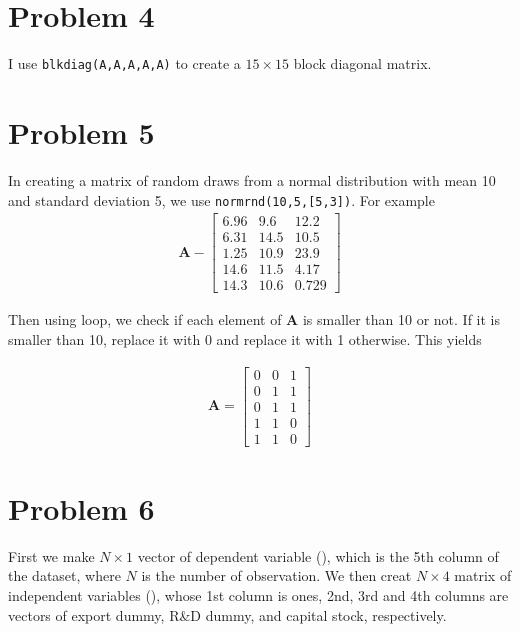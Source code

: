 \documentclass[11pt,letter]{article}
\newcommand{\vect}[1]{\boldsymbol{\mathbf{#1}}}
\newcounter{lem}[section] \setcounter{lem}{0}
\newcommand{\code}[1]{\texttt{#1}}
\begin{document}
\section*{Problem 4}
I use \code{blkdiag(A,A,A,A,A)} to create a $15\times15$ block diagonal matrix. 

\section*{Problem 5}

In creating a matrix of random draws from a normal distribution with mean 10 and standard deviation 5, we use \code{normrnd(10,5,[5,3])}. For example
\begin{align*}
\vect{A} - \left[\begin{array}{rrr} 6.96 & 9.6 & 12.2\\ 6.31 & 14.5 & 10.5\\ 1.25 & 10.9 & 23.9\\ 14.6 & 11.5 & 4.17\\ 14.3 & 10.6 & 0.729 \end{array}\right]
\end{align*}

Then using loop, we check if each element of $\vect{A}$ is smaller than 10 or not. If it is smaller than 10, replace it with 0 and replace it with 1 otherwise. This yields

\begin{align*}
\vect{A} = \left[\begin{array}{rrr} 0 & 0 & 1\\ 0 & 1 & 1\\ 0 & 1 & 1\\ 1 & 1 & 0\\ 1 & 1 & 0 \end{array}\right]
\end{align*}

\section*{Problem 6}

First we make $N\times 1$ vector of dependent variable (\vect{Y}), which is the 5th column of the dataset, where $N$ is the number of observation. We then creat $N\times 4$ matrix of independent variables (\vect{X}),  whose 1st column is ones, 2nd, 3rd and 4th columns are vectors of export dummy, R\&D dummy, and capital stock, respectively. 
\end{document}
